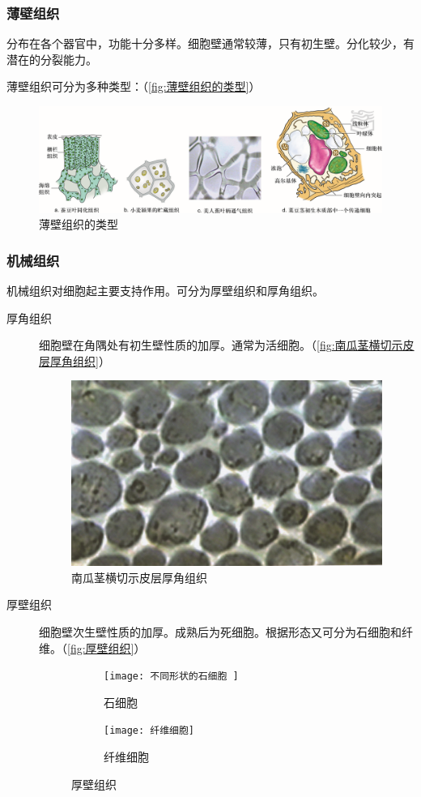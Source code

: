 \subsubsection{薄壁组织}

分布在各个器官中，功能十分多样。细胞壁通常较薄，只有初生壁。分化较少，有潜在的分裂能力。

薄壁组织可分为多种类型：（\autoref{fig:薄壁组织的类型}）

\begin{figure}[htbp]
	\centering
	\includegraphics[width=\linewidth]{Pics/薄壁组织的类型}
	\caption{薄壁组织的类型}
	\label{fig:薄壁组织的类型}
\end{figure}

\subsubsection{机械组织}

机械组织对细胞起主要支持作用。可分为厚壁组织和厚角组织。

\begin{description}
	\item[厚角组织] 细胞壁在角隅处有初生壁性质的加厚。通常为活细胞。（\autoref{fig:南瓜茎横切示皮层厚角组织}）
	
	\begin{figure}[htbp]
		\centering
		\includegraphics[width=0.5\linewidth]{Pics/南瓜茎横切示皮层厚角组织}
		\caption{南瓜茎横切示皮层厚角组织}
		\label{fig:南瓜茎横切示皮层厚角组织}
	\end{figure}
	
	\item[厚壁组织] 细胞壁次生壁性质的加厚。成熟后为死细胞。根据形态又可分为石细胞和纤维。（\autoref{fig:厚壁组织}）
	
	\begin{figure}[htbp]
		\centering
		\begin{subfigure}{0.45\textwidth}
			\texttt{[image: 不同形状的石细胞
			]}
			\caption{石细胞}
		\end{subfigure}
		\hfill
		\begin{subfigure}{0.45\textwidth}
			\texttt{[image: 纤维细胞]}
			\caption{纤维细胞}
		\end{subfigure}
		\caption{厚壁组织}
		\label{fig:厚壁组织}
	\end{figure}
\end{description}

